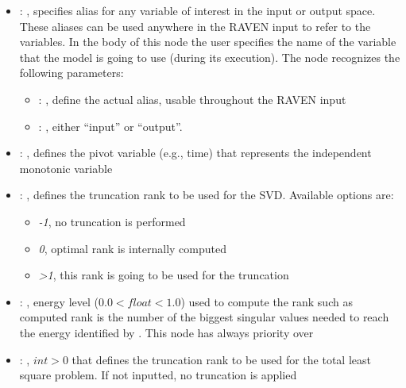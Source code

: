 \begin{itemize}
    \item {}: , 
      specifies alias for         any variable of interest in the input or output space. These
      aliases can be used anywhere in the RAVEN input to         refer to the variables. In the body
      of this node the user specifies the name of the variable that the model is going to use
      (during its execution).
      The  node recognizes the following parameters:
        \begin{itemize}
          \item {}: , 
            define the actual alias, usable throughout the RAVEN input
          \item {}: , 
            either ``input'' or ``output''.
      \end{itemize}

    \item {}: , 
      defines the pivot variable (e.g., time) that represents the
      independent monotonic variable

    \item {}: , 
      defines the truncation rank to be used for the SVD.
      Available options are:                                                  \begin{itemize}
      \item \textit{-1}, no truncation is performed
      \item \textit{0}, optimal rank is internally computed
      \item \textit{>1}, this rank is going to be used for the truncation
      \end{itemize}

    \item {}: , 
      energy level ($0.0 < float < 1.0$) used to compute the rank such
      as computed rank is the number of the biggest singular values needed to reach the energy
      identified by                                                    . This
      node has always priority over  

    \item {}: , 
      $int > 0$ that defines the truncation rank to be used for the total
      least square problem. If not inputted, no truncation is applied


\end{itemize}
